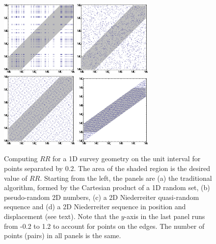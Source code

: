 \documentclass[usenatbib]{mn2e}
\begin{document}
\begin{figure}
\includegraphics[width=1.5in]{plots/grid1d-1}
\includegraphics[width=1.5in]{plots/grid1d-2}
\includegraphics[width=1.5in]{plots/grid1d-3}
\includegraphics[width=1.5in]{plots/grid1d-4}
\caption{Computing $RR$ for a 1D survey geometry on the unit interval
for points separated by 0.2. The area of the shaded region is the desired value
of $RR$. Starting from the left, the panels are (a) the traditional algorithm,
formed by the Cartesian product of a 1D random set, (b) pseudo-random 2D
numbers, (c) a 2D Niederreiter quasi-random sequence and (d) a 2D Niederreiter
sequence in position and displacement (see text). Note that the $y$-axis in the
last panel runs from -0.2 to 1.2 to account for points on the edges. The number
of points (pairs) in all panels is the same.}
\label{fig:grid1d}
\end{figure}
\end{document}
